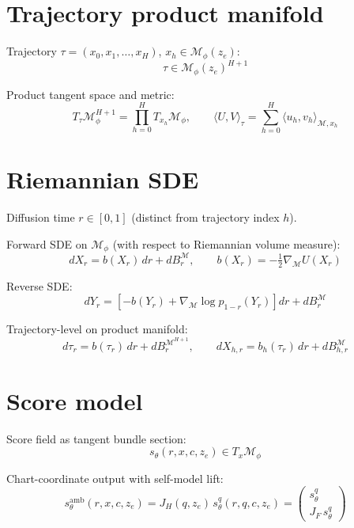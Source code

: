 \documentclass[11pt,a4paper]{article}
\newcommand{\Mphi}{\mathcal{M}_{\phi}}
\newcommand{\Mset}{\mathcal{M}}
\begin{document}
\section{Trajectory product manifold}

Trajectory $\tau = (x_0, x_1, \ldots, x_H)$, $x_h \in \Mphi(z_e)$:
\begin{equation}
\tau \in \Mphi(z_e)^{H+1}
\end{equation}

Product tangent space and metric:
\begin{equation}
T_\tau \Mphi^{H+1} = \prod_{h=0}^{H} T_{x_h} \Mphi, \qquad \langle U, V \rangle_\tau = \sum_{h=0}^{H} \langle u_h, v_h \rangle_{\Mset, x_h}
\end{equation}

\section{Riemannian SDE}

Diffusion time $r \in [0, 1]$ (distinct from trajectory index $h$).

Forward SDE on $\Mphi$ (with respect to Riemannian volume measure):
\begin{equation}
dX_r = b(X_r) \, dr + dB^{\Mset}_r, \qquad b(X_r) = -\tfrac{1}{2} \nabla_{\Mset} U(X_r)
\end{equation}

Reverse SDE:
\begin{equation}
dY_r = \left[ -b(Y_r) + \nabla_{\Mset} \log p_{1-r}(Y_r) \right] dr + dB^{\Mset}_r
\end{equation}

Trajectory-level on product manifold:
\begin{equation}
d\tau_r = b(\tau_r) \, dr + dB^{\Mset^{H+1}}_r, \qquad dX_{h, r} = b_h(\tau_r) \, dr + dB^{\Mset}_{h, r}
\end{equation}

\section{Score model}

Score field as tangent bundle section:
\begin{equation}
s_\theta(r, x, c, z_e) \in T_x \Mphi
\end{equation}

Chart-coordinate output with self-model lift:
\begin{equation}
s_\theta^{\text{amb}}(r, x, c, z_e) = J_H(q, z_e) \, s_\theta^q(r, q, c, z_e) = \begin{pmatrix} s_\theta^q \\ J_F \, s_\theta^q \end{pmatrix}
\end{equation}
\end{document}
